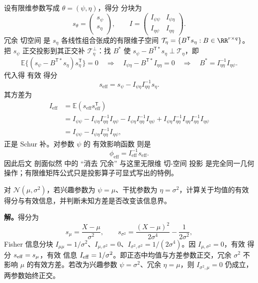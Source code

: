 设有限维参数写成 $\theta=(\psi,\eta)$，得分 分块为
\[
 s_\theta=
 \begin{pmatrix}
 s_\psi\\ s_\eta
 \end{pmatrix},
 \qquad
 I=
 \begin{pmatrix}
 I_{\psi\psi}&I_{\psi\eta}\\
 I_{\eta\psi}&I_{\eta\eta}
 \end{pmatrix}.
\]
冗余 切空间 是 $s_\eta$ 各线性组合张成的有限维子空间 $\mathcal T_\eta=\{B^{\mathsf T}s_\eta:B\in\RR^{r\times q}\}$。把 $s_\psi$ 正交投影到其正交补 $\mathcal T_\eta^\perp$：找 $B^*$ 使 $s_\psi-B^{{\mathsf T}*}s_\eta\perp\mathcal T_\eta$，即
\[
\mathbb E\{(s_\psi-B^{{\mathsf T}*}s_\eta)s_\eta^{\mathsf T}\}=0
\quad\Longrightarrow\quad
I_{\psi\eta}-B^{{\mathsf T}*}I_{\eta\eta}=0
\quad\Longrightarrow\quad
B^*=I_{\eta\eta}^{-1}I_{\eta\psi}.
\]
代入得 有效 得分
\[
 s_{\mathrm{eff}}
 =s_\psi-
 I_{\psi\eta}I_{\eta\eta}^{-1}s_\eta.
\]
其方差为
\[
 \begin{aligned}
 I_{\mathrm{eff}}
 &=\mathbb E(s_{\mathrm{eff}}s_{\mathrm{eff}}^{\mathsf T})\\
 &=I_{\psi\psi}
 -I_{\psi\eta}I_{\eta\eta}^{-1}I_{\eta\psi}
 -I_{\psi\eta}I_{\eta\eta}^{-1}I_{\eta\psi}
 +I_{\psi\eta}I_{\eta\eta}^{-1}I_{\eta\eta}I_{\eta\eta}^{-1}I_{\eta\psi}\\
 &=I_{\psi\psi}
 -I_{\psi\eta}I_{\eta\eta}^{-1}I_{\eta\psi},
 \end{aligned}
\]
正是 Schur 补。对参数 $\psi$ 的 有效影响函数 则是
\[
 \phi_{\mathrm{eff}}
 =I_{\mathrm{eff}}^{-1}s_{\mathrm{eff}}.
\]
因此后文 剖面似然 中的 ``消去 冗余'' 与这里无限维 切-空间 投影 是完全同一几何操作；有限维矩阵公式只是投影算子可显式写出的特例。


\begin{workedexample}[正态均值与方差参数的正交性]
对 $\mathcal N(\mu,\sigma^2)$，若兴趣参数为 $\psi=\mu$、干扰参数为 $\eta=\sigma^2$，计算关于均值的有效得分与有效信息，并判断未知方差是否改变该信息界。

\textbf{解。}得分为
\[
s_\mu=\frac{X-\mu}{\sigma^2},
\qquad
s_{\sigma^2}=\frac{(X-\mu)^2}{2\sigma^4}-\frac1{2\sigma^2},
\]
Fisher 信息分块 $I_{\mu\mu}=1/\sigma^2$、$I_{\mu,\sigma^2}=0$、$I_{\sigma^2,\sigma^2}=1/(2\sigma^4)$。因 $I_{\mu,\sigma^2}=0$，有效 得分 $s_{\rm eff}=s_\mu$，有效 信息 $I_{\rm eff}=1/\sigma^2$。即正态中均值与方差参数正交，冗余 $\sigma^2$ 不影响 $\mu$ 的有效方差。若改为兴趣参数 $\psi=\sigma^2$、冗余 $\eta=\mu$，则 $I_{\sigma^2,\mu}=0$ 仍成立，两参数始终正交。
\end{workedexample}

